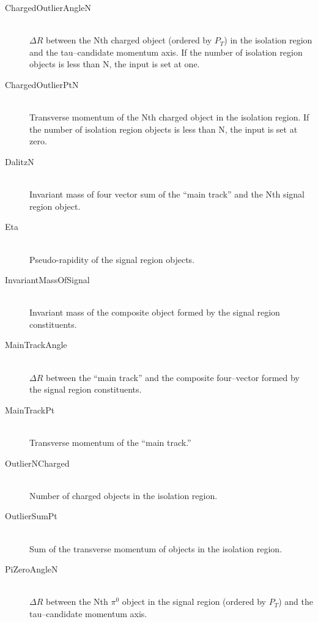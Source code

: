 
\begin{description}
    
  \item[ChargedOutlierAngleN] \hfill \\
  $\Delta R$ between the Nth charged object (ordered by $P_T$) in the isolation region
    and the tau--candidate momentum axis. If the number of
    isolation region objects is less than N, the input is set at one.

  \item[ChargedOutlierPtN] \hfill \\
  Transverse momentum of the Nth charged object in the isolation region.  If the number of
    isolation region objects is less than N, the input is set at zero.

  \item[DalitzN] \hfill \\
   Invariant mass of four vector sum of the ``main track'' and the Nth signal
    region object. 

  \item[Eta] \hfill \\
  Pseudo-rapidity of the signal region objects. 

  \item[InvariantMassOfSignal] \hfill \\
  Invariant mass of the composite object formed by the signal region constituents.

  \item[MainTrackAngle] \hfill \\
  $\Delta R$ between the ``main track'' and the composite four--vector formed by the 
    signal region constituents.

  \item[MainTrackPt] \hfill \\
  Transverse momentum of the ``main track.'' 

  \item[OutlierNCharged] \hfill \\
  Number of charged objects in the isolation region.

  \item[OutlierSumPt] \hfill \\
  Sum of the transverse momentum of objects in the isolation region.

  \item[PiZeroAngleN] \hfill \\
  $\Delta R$ between the Nth $\pi^0$ object in the signal region (ordered by $P_T$) and
    the tau--candidate momentum axis.


\end{description}
